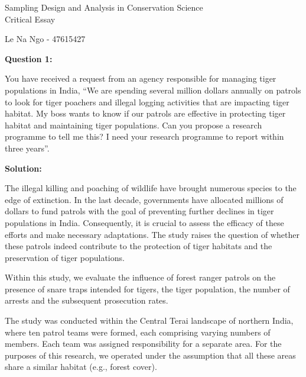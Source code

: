\documentclass[11pt]{article}
\begin{document}
\onecolumn
\begin{center}
\vspace*{8em}
{\huge {Sampling Design and Analysis in Conservation Science}}\\
\bigskip
\bigskip
{\huge Critical Essay}\\
\bigskip
\bigskip
\bigskip
\bigskip


{\large Le Na Ngo - 47615427}

\bigskip
\end{center}

\clearpage


\bigskip
\begin{center}

\textbf{Question 1:}

\end{center}

You have received a request from an agency responsible for managing tiger populations in India, “We are spending several million dollars annually on patrols to look for tiger poachers and illegal logging activities that are impacting tiger habitat. My boss wants to know if our patrols are effective in protecting tiger habitat and maintaining tiger populations. Can you propose a research programme to tell me this? I need your research programme to report within three years”. 

\bigskip
\bigskip
\begin{center}

\textbf{Solution:} 

\end{center}

The illegal killing and poaching of wildlife have brought numerous species to the edge of extinction. In the last decade, governments have allocated millions of dollars to fund patrols with the goal of preventing further declines in tiger populations in India. Consequently, it is crucial to assess the efficacy of these efforts and make necessary adaptations. The study raises the question of whether these patrols indeed contribute to the protection of tiger habitats and the preservation of tiger populations. 

Within this study, we evaluate the influence of forest ranger patrols on the presence of snare traps intended for tigers, the tiger population, the number of arrests and the subsequent prosecution rates.

The study was conducted within the Central Terai landscape of northern India, where ten patrol teams were formed, each comprising varying numbers of members. Each team was assigned responsibility for a separate area. For the purposes of this research, we operated under the assumption that all these areas share a similar habitat (e.g., forest cover). 
\end{document}
